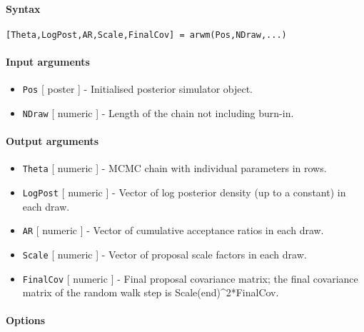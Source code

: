 


	\paragraph{Syntax}

\begin{verbatim}
[Theta,LogPost,AR,Scale,FinalCov] = arwm(Pos,NDraw,...)
\end{verbatim}

\paragraph{Input arguments}

\begin{itemize}
\item
  \texttt{Pos} {[} poster {]} - Initialised posterior simulator object.
\item
  \texttt{NDraw} {[} numeric {]} - Length of the chain not including
  burn-in.
\end{itemize}

\paragraph{Output arguments}

\begin{itemize}
\item
  \texttt{Theta} {[} numeric {]} - MCMC chain with individual parameters
  in rows.
\item
  \texttt{LogPost} {[} numeric {]} - Vector of log posterior density (up
  to a constant) in each draw.
\item
  \texttt{AR} {[} numeric {]} - Vector of cumulative acceptance ratios
  in each draw.
\item
  \texttt{Scale} {[} numeric {]} - Vector of proposal scale factors in
  each draw.
\item
  \texttt{FinalCov} {[} numeric {]} - Final proposal covariance matrix;
  the final covariance matrix of the random walk step is
  Scale(end)\^{}2*FinalCov.
\end{itemize}

\paragraph{Options}

